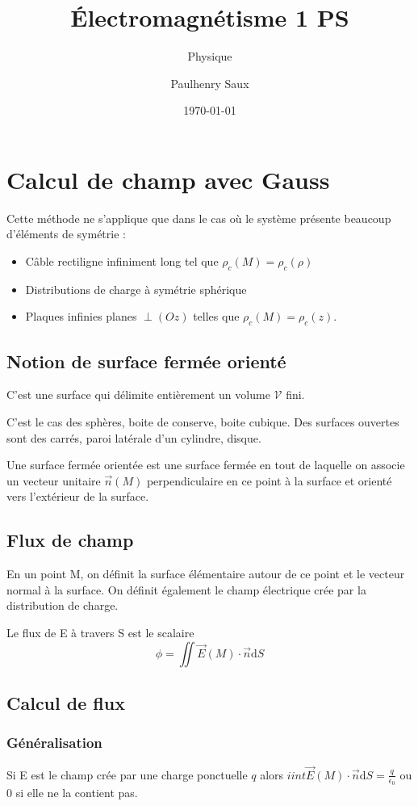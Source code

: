 \documentclass[french]{yLectureNote}
\title{Électromagnétisme 1 PS}
\subtitle{Physique}
\author{Paulhenry Saux}
\date{\today}
\renewcommand{\vec}{\overrightarrow}
\newcommand{\dd}{\mathrm{d}}
\newcommand{\E}{\vec{E}(M)}
\newcommand{\mv}{\mathcal{V}}
\begin{document}
\setcounter{chapter}{4}
\chapter{Calcul de champ avec Gauss}
Cette méthode ne s'applique que dans le cas où le système présente beaucoup d'éléments de symétrie :
\begin{itemize}
 \item C\^able rectiligne infiniment long tel que \(\rho_c(M) = \rho_c(\rho)\)
 \item Distributions de charge à symétrie sphérique
 \item Plaques infinies planes \(\perp (Oz)\) telles que \(\rho_c(M) = \rho_c(z)\).
\end{itemize}
\section{Notion de surface fermée orienté}
\begin{definition}
C'est une surface qui délimite entièrement un volume \(\mv\) fini.
\end{definition}
C'est le cas des sphères, boite de conserve, boite cubique. Des surfaces ouvertes sont des carrés, paroi latérale d'un cylindre, disque.

\begin{definition}
Une surface fermée orientée  est une surface fermée en tout de laquelle on associe un vecteur unitaire \(\vec{n}(M)\) perpendiculaire en ce point à la surface et orienté vers l'extérieur de la surface.
\end{definition}
\section{Flux de champ}
En un point M, on définit la surface élémentaire autour de ce point et le vecteur normal à la surface. On définit également le champ électrique crée par la distribution de charge.

\begin{definition}
Le flux de E à travers S est le scalaire \[\phi = \iint \E \cdot \vec{n}\dd S\]
\end{definition}
\section{Calcul de flux}
\subsection{Généralisation}
Si E est le champ crée par une charge ponctuelle \(q\) alors \(iint \E \cdot \vec{n}\dd S = \frac{q}{\epsilon_0}\) ou 0 si elle ne la contient pas.
\end{document}
